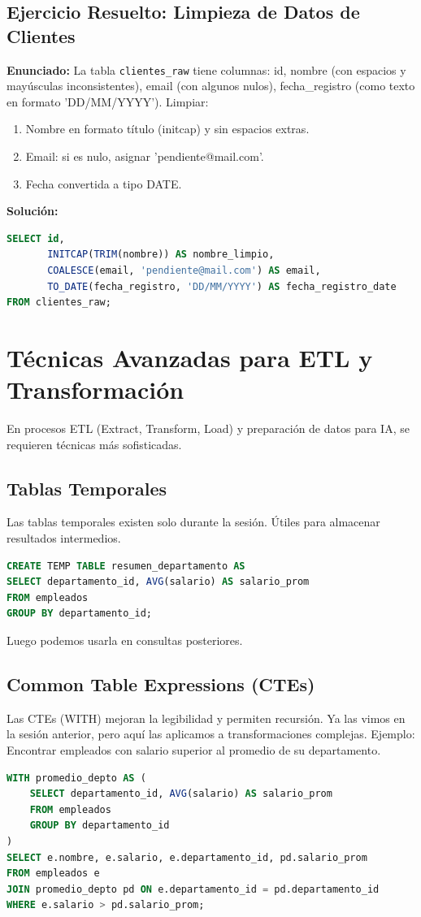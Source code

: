\documentclass[12pt,a4paper,openany,oneside]{book}
\begin{document}
\section{Ejercicio Resuelto: Limpieza de Datos de Clientes}
\textbf{Enunciado:} La tabla \texttt{clientes\_raw} tiene columnas: id, nombre (con espacios y mayúsculas inconsistentes), email (con algunos nulos), fecha\_registro (como texto en formato 'DD/MM/YYYY'). Limpiar:
\begin{enumerate}
    \item Nombre en formato título (initcap) y sin espacios extras.
    \item Email: si es nulo, asignar 'pendiente@mail.com'.
    \item Fecha convertida a tipo DATE.
\end{enumerate}
\textbf{Solución:}
\begin{lstlisting}[language=SQL]
SELECT id,
       INITCAP(TRIM(nombre)) AS nombre_limpio,
       COALESCE(email, 'pendiente@mail.com') AS email,
       TO_DATE(fecha_registro, 'DD/MM/YYYY') AS fecha_registro_date
FROM clientes_raw;
\end{lstlisting}

\chapter{Técnicas Avanzadas para ETL y Transformación}
En procesos ETL (Extract, Transform, Load) y preparación de datos para IA, se requieren técnicas más sofisticadas.

\section{Tablas Temporales}
Las tablas temporales existen solo durante la sesión. Útiles para almacenar resultados intermedios.
\begin{lstlisting}[language=SQL]
CREATE TEMP TABLE resumen_departamento AS
SELECT departamento_id, AVG(salario) AS salario_prom
FROM empleados
GROUP BY departamento_id;
\end{lstlisting}
Luego podemos usarla en consultas posteriores.

\section{Common Table Expressions (CTEs)}
Las CTEs (WITH) mejoran la legibilidad y permiten recursión. Ya las vimos en la sesión anterior, pero aquí las aplicamos a transformaciones complejas.
Ejemplo: Encontrar empleados con salario superior al promedio de su departamento.
\begin{lstlisting}[language=SQL]
WITH promedio_depto AS (
    SELECT departamento_id, AVG(salario) AS salario_prom
    FROM empleados
    GROUP BY departamento_id
)
SELECT e.nombre, e.salario, e.departamento_id, pd.salario_prom
FROM empleados e
JOIN promedio_depto pd ON e.departamento_id = pd.departamento_id
WHERE e.salario > pd.salario_prom;
\end{lstlisting}
\end{document}
